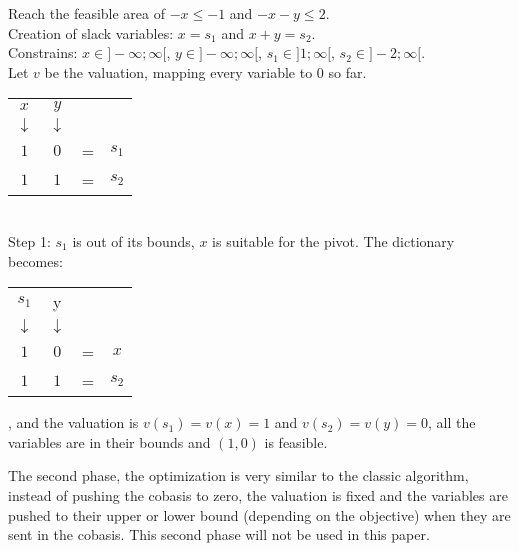\begin{example}
	Reach the feasible area of $-x \leq -1$ and $-x-y\leq 2$.\\
	Creation of slack variables: $x = s_1$ and $x+y=s_2$.\\
	Constrains: $x\in ]-\infty;\infty[$, $y\in ]-\infty;\infty[$, $s_1\in ]1;\infty[$, $s_2\in ]-2;\infty[$.\\
	Let $v$ be the valuation, mapping every variable to $0$ so far. 
	\begin{tabular}{| c | c | c | c |}
	\hline	
	$x$ & $y$ & & \\
	$\downarrow$ & $\downarrow$ & & \\
	\hline
	\hline	
   	$1$ & $0$ & = & $s_1$\\ \hline	
   	$1$ & $1$ & = & $s_2$\\ \hline 
 	\end{tabular}\\
	Step 1: $s_1$ is out of its bounds, $x$ is suitable for the pivot. The dictionary becomes:
	\begin{tabular}{| c | c | c | c |}
	\hline	
	$s_1$ & y & & \\
	$\downarrow$ & $\downarrow$ & & \\
	\hline
	\hline	
   	$1$ & $0$ & = & $x$\\ \hline	
   	$1$ & $1$ & = & $s_2$\\ \hline
 	\end{tabular},
 	and the valuation is $v(s_1)=v(x)=1$ and $v(s_2)=v(y)=0$, all the variables are in their bounds and $(1,0)$ is feasible.
	\label{lp5}
\end{example}

The second phase, the optimization is very similar to the classic algorithm, instead of pushing the cobasis to zero, the valuation is fixed and the variables are pushed to their upper or lower bound (depending on the objective) when they are sent in the cobasis. This second phase will not be used in this paper.





